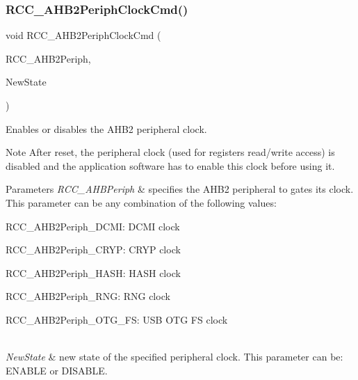 \mbox{\label{group___r_c_c_gaadffedbd87e796f01d9776b8ee01ff5e}} 
\subsubsection{\texorpdfstring{R\+C\+C\+\_\+\+A\+H\+B2\+Periph\+Clock\+Cmd()}{RCC\_AHB2PeriphClockCmd()}}
{\footnotesize\ttfamily void R\+C\+C\+\_\+\+A\+H\+B2\+Periph\+Clock\+Cmd (\begin{DoxyParamCaption}\item[{uint32\+\_\+t}]{R\+C\+C\+\_\+\+A\+H\+B2\+Periph,  }\item[{Functional\+State}]{New\+State }\end{DoxyParamCaption})}



Enables or disables the A\+H\+B2 peripheral clock. 

\begin{DoxyNote}{Note}
After reset, the peripheral clock (used for registers read/write access) is disabled and the application software has to enable this clock before using it. 
\end{DoxyNote}

\begin{DoxyParams}{Parameters}
{\em R\+C\+C\+\_\+\+A\+H\+B\+Periph} & specifies the A\+H\+B2 peripheral to gates its clock. This parameter can be any combination of the following values\+: \begin{DoxyItemize}
\item R\+C\+C\+\_\+\+A\+H\+B2\+Periph\+\_\+\+D\+C\+MI\+: D\+C\+MI clock \item R\+C\+C\+\_\+\+A\+H\+B2\+Periph\+\_\+\+C\+R\+YP\+: C\+R\+YP clock \item R\+C\+C\+\_\+\+A\+H\+B2\+Periph\+\_\+\+H\+A\+SH\+: H\+A\+SH clock \item R\+C\+C\+\_\+\+A\+H\+B2\+Periph\+\_\+\+R\+NG\+: R\+NG clock \item R\+C\+C\+\_\+\+A\+H\+B2\+Periph\+\_\+\+O\+T\+G\+\_\+\+FS\+: U\+SB O\+TG FS clock \end{DoxyItemize}
\\
\hline
{\em New\+State} & new state of the specified peripheral clock. This parameter can be\+: E\+N\+A\+B\+LE or D\+I\+S\+A\+B\+LE. \\
\hline
\end{DoxyParams}

